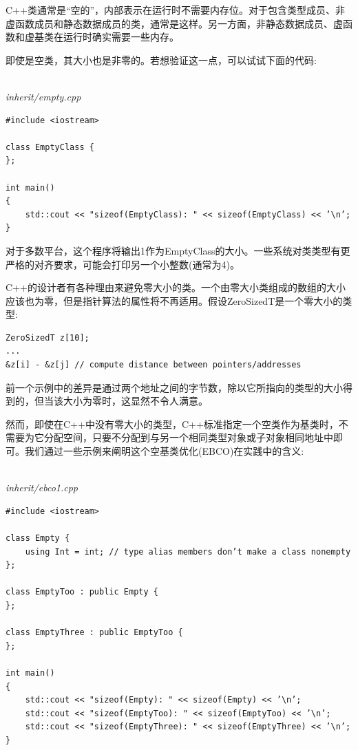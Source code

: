 
C++类通常是“空的”，内部表示在运行时不需要内存位。对于包含类型成员、非虚函数成员和静态数据成员的类，通常是这样。另一方面，非静态数据成员、虚函数和虚基类在运行时确实需要一些内存。

即使是空类，其大小也是非零的。若想验证这一点，可以试试下面的代码:

\hspace*{\fill} \\ %
\noindent
\textit{inherit/empty.cpp}
\begin{lstlisting}[style=styleCXX]
#include <iostream>

class EmptyClass {
};

int main()
{
	std::cout << "sizeof(EmptyClass): " << sizeof(EmptyClass) << ’\n’;
}
\end{lstlisting}

对于多数平台，这个程序将输出1作为EmptyClass的大小。一些系统对类类型有更严格的对齐要求，可能会打印另一个小整数(通常为4)。


C++的设计者有各种理由来避免零大小的类。一个由零大小类组成的数组的大小应该也为零，但是指针算法的属性将不再适用。假设ZeroSizedT是一个零大小的类型:

\begin{lstlisting}[style=styleCXX]
ZeroSizedT z[10];
...
&z[i] - &z[j] // compute distance between pointers/addresses
\end{lstlisting}

前一个示例中的差异是通过两个地址之间的字节数，除以它所指向的类型的大小得到的，但当该大小为零时，这显然不令人满意。

然而，即使在C++中没有零大小的类型，C++标准指定一个空类作为基类时，不需要为它分配空间，只要不分配到与另一个相同类型对象或子对象相同地址中即可。我们通过一些示例来阐明这个空基类优化(EBCO)在实践中的含义:

\hspace*{\fill} \\ %
\noindent
\textit{inherit/ebco1.cpp}
\begin{lstlisting}[style=styleCXX]
#include <iostream>

class Empty {
	using Int = int; // type alias members don’t make a class nonempty
};

class EmptyToo : public Empty {
};

class EmptyThree : public EmptyToo {
};

int main()
{
	std::cout << "sizeof(Empty): " << sizeof(Empty) << ’\n’;
	std::cout << "sizeof(EmptyToo): " << sizeof(EmptyToo) << ’\n’;
	std::cout << "sizeof(EmptyThree): " << sizeof(EmptyThree) << ’\n’;
}
\end{lstlisting}

